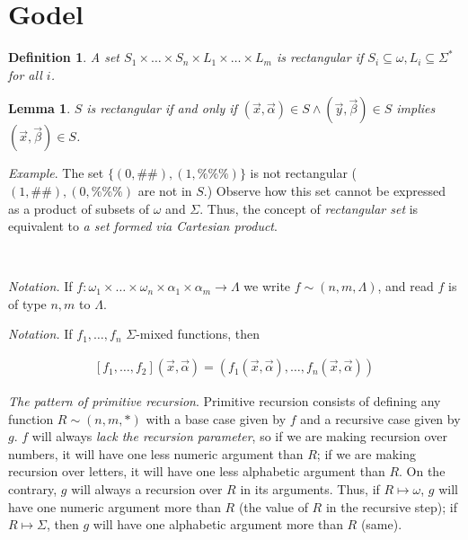\documentclass[a4paper, 12pt]{article}
\newtheorem{lemma}{Lemma}
\newtheorem{definition}{Definition}
\newtheorem{lemma}{Lemma}
\begin{document}
\pagebreak
\section{Godel}

\begin{definition}
    A set $S_1\times  \ldots  \times  S_n \times L_1 \times  \ldots \times  L_m$ is
    rectangular if $S_i \subseteq \omega, L_i \subseteq \Sigma^{*}$ for all $i$.
\end{definition}

\begin{lemma}
    $S$ is rectangular if and only if $(\overrightarrow{x},
    \overrightarrow{\alpha}) \in S \land (\overrightarrow{y},
    \overrightarrow{\beta}) \in S$ implies $(\overrightarrow{x},
    \overrightarrow{\beta}) \in S$.
\end{lemma}

\textit{Example}. The set $\{(0, \#\#), (1, \%\%\%)\}$ is not rectangular ($(1,
\#\#), (0, \%\%\%)$ are not in $S$.) Observe how this set cannot be expressed as
a product of subsets of $\omega$ and $\Sigma$. Thus, the concept of
\textit{rectangular set} is equivalent to \textit{a set formed via Cartesian
product}.

~

\textit{Notation.} If $f : \omega_1 \times \ldots \times \omega_n \times
\alpha_1 \times \alpha_m \to \Lambda$ we write $f \sim (n, m, \Lambda)$, and
read $f$ is of type $n, m$ to $\Lambda$.

\textit{Notation.} If $f_1, \ldots, f_n$ $\Sigma$-mixed functions, then 

\begin{align*}
    \left[ f_1, \ldots, f_2 \right](\overrightarrow{x}, \overrightarrow{\alpha})
    = \left( f_1(\overrightarrow{x}, \overrightarrow{\alpha}), \ldots,
    f_n(\overrightarrow{x}, \overrightarrow{\alpha}) \right) 
\end{align*}


\textit{The pattern of primitive recursion}. Primitive recursion consists of
defining any function $R \sim (n, m, *)$ with a base case given by $f$ and a
recursive case given by $g$. $f$ will always \textit{lack the recursion
parameter}, so if we are making recursion over numbers, it will have one less
numeric argument than $R$; if we are making recursion over letters, it will have
one less alphabetic argument than $R$. On the contrary, $g$ will always a
recursion over $R$ in its arguments. Thus, if $R \mapsto \omega$, $g$ will have
one numeric argument more than $R$ (the value of $R$ in the recursive step); if
$R \mapsto \Sigma$, then $g$ will have one alphabetic argument more than $R$
(same).
\end{document}
